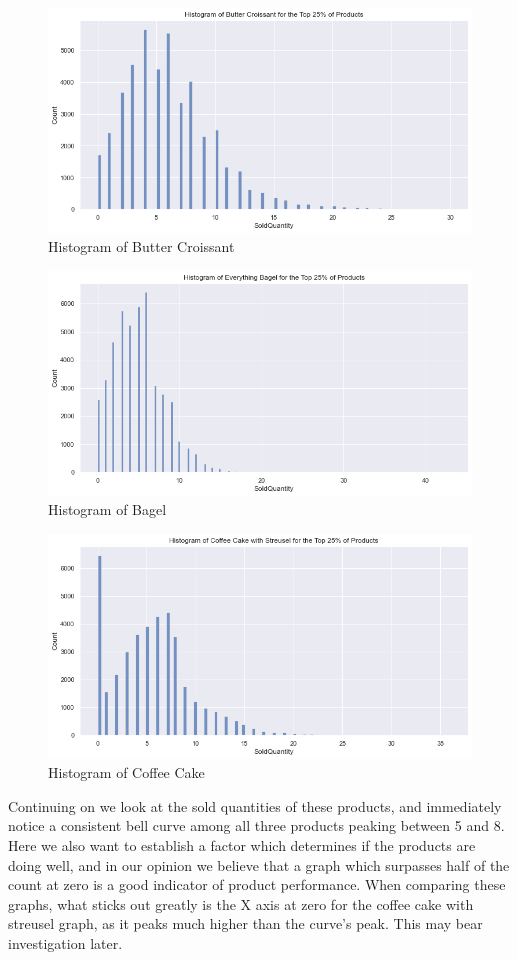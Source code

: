 \begin{figure}[ht]
    \centering
    \includegraphics[width = 0.56\linewidth]{figures/figure9.png}
    \caption{Histogram of Butter Croissant }
\end{figure}

\begin{figure}[ht]
    \centering
    \includegraphics[width = 0.56\linewidth]{figures/figure10.png}
    \caption{Histogram of Bagel }
\end{figure}

\begin{figure}[ht]
    \centering
    \includegraphics[width = 0.56\linewidth]{figures/figure11.png}
    \caption{Histogram of Coffee Cake }
\end{figure}

Continuing on we look at the sold quantities of these products, and immediately notice a consistent bell curve among all three products peaking between 5 and 8. Here we also want to establish a factor which determines if the products are doing well, and in our opinion we believe that a graph which surpasses half of the count at zero is a good indicator of product performance. When comparing these graphs, what sticks out greatly is the X axis at zero for the coffee cake with streusel graph, as it peaks much higher than the curve’s peak. This may bear investigation later.

